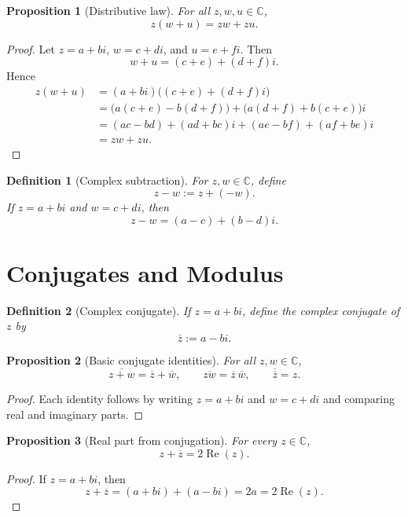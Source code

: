 \documentclass[11pt]{article}
\newtheorem{definition}{Definition}[section]
\newtheorem{proposition}{Proposition}[section]
\newcommand{\C}{\mathbb{C}}
\newcommand{\conj}[1]{\overline{#1}}
\newcommand{\Real}{\operatorname{Re}}
\begin{document}
\begin{proposition}[Distributive law]
For all $z,w,u\in\C$,
\[
  z(w+u)=zw+zu.
\]
\end{proposition}

\begin{proof}
Let $z=a+bi$, $w=c+di$, and $u=e+fi$. Then
\[
  w+u=(c+e)+(d+f)i.
\]
Hence
\[
\begin{aligned}
  z(w+u)
    &= (a+bi)\bigl((c+e)+(d+f)i\bigr) \\
    &= \bigl(a(c+e)-b(d+f)\bigr)
       +\bigl(a(d+f)+b(c+e)\bigr)i \\
    &= (ac-bd)+(ad+bc)i+(ae-bf)+(af+be)i \\
    &= zw+zu.
\end{aligned}
\]
\end{proof}

\begin{definition}[Complex subtraction]
For $z,w\in\C$, define
\[
  z-w := z+(-w).
\]
If $z=a+bi$ and $w=c+di$, then
\[
  z-w=(a-c)+(b-d)i.
\]
\end{definition}

\section{Conjugates and Modulus}

\begin{definition}[Complex conjugate]
If $z=a+bi$, define the complex conjugate of $z$ by
\[
  \conj{z}:=a-bi.
\]
\end{definition}

\begin{proposition}[Basic conjugate identities]
For all $z,w\in\C$,
\[
  \conj{z+w}=\conj{z}+\conj{w},
  \qquad
  \conj{zw}=\conj{z}\,\conj{w},
  \qquad
  \conj{\conj{z}}=z.
\]
\end{proposition}

\begin{proof}
Each identity follows by writing $z=a+bi$ and $w=c+di$ and comparing real and imaginary parts.
\end{proof}

\begin{proposition}[Real part from conjugation]
For every $z\in\C$,
\[
  z+\conj{z}=2\Real(z).
\]
\end{proposition}

\begin{proof}
If $z=a+bi$, then
\[
  z+\conj{z}=(a+bi)+(a-bi)=2a=2\Real(z).
\]
\end{proof}
\end{document}
